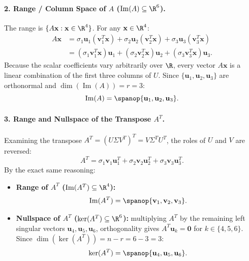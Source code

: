\paragraph{2. Range / Column Space of $A$ ($\operatorname{Im}(A) \subseteq \R^6$).}
The range is $\{A\mathbf{x} : \mathbf{x} \in \R^4\}$. For any $\mathbf{x} \in \R^4$:
\begin{align}
    A\mathbf{x} &= \sigma_1 \mathbf{u}_1 (\mathbf{v}_1^T \mathbf{x}) + \sigma_2 \mathbf{u}_2 (\mathbf{v}_2^T \mathbf{x}) + \sigma_3 \mathbf{u}_3 (\mathbf{v}_3^T \mathbf{x}) \nonumber \\
                &= (\sigma_1 \mathbf{v}_1^T \mathbf{x}) \mathbf{u}_1 + (\sigma_2 \mathbf{v}_2^T \mathbf{x}) \mathbf{u}_2 + (\sigma_3 \mathbf{v}_3^T \mathbf{x}) \mathbf{u}_3.
\end{align}
Because the scalar coefficients vary arbitrarily over $\R$, every vector $A\mathbf{x}$ is a linear combination of the first three columns of $U$. Since $\{\mathbf{u}_1, \mathbf{u}_2, \mathbf{u}_3\}$ are orthonormal and $\dim(\operatorname{Im}(A)) = r = 3$:
\begin{equation}
    \operatorname{Im}(A) = \spanop\{\mathbf{u}_1, \mathbf{u}_2, \mathbf{u}_3\}.
\end{equation}

\paragraph{3. Range and Nullspace of the Transpose $A^T$.}
Examining the transpose $A^T = (U \Sigma V^T)^T = V \Sigma^T U^T$, the roles of $U$ and $V$ are reversed:
\begin{equation}
    A^T = \sigma_1 \mathbf{v}_1 \mathbf{u}_1^T + \sigma_2 \mathbf{v}_2 \mathbf{u}_2^T + \sigma_3 \mathbf{v}_3 \mathbf{u}_3^T.
\end{equation}
By the exact same reasoning:
\begin{itemize}
    \item \textbf{Range of $A^T$ ($\operatorname{Im}(A^T) \subseteq \R^4$):}
    \begin{equation}
        \operatorname{Im}(A^T) = \spanop\{\mathbf{v}_1, \mathbf{v}_2, \mathbf{v}_3\}.
    \end{equation}
    \item \textbf{Nullspace of $A^T$ ($\ker(A^T) \subseteq \R^6$):}
    multiplying $A^T$ by the remaining left singular vectors $\mathbf{u}_4, \mathbf{u}_5, \mathbf{u}_6$, orthogonality gives $A^T \mathbf{u}_k = \mathbf{0}$ for $k \in \{4, 5, 6\}$. Since $\dim(\ker(A^T)) = n - r = 6 - 3 = 3$:
    \begin{equation}
        \ker(A^T) = \spanop\{\mathbf{u}_4, \mathbf{u}_5, \mathbf{u}_6\}.
    \end{equation}
\end{itemize}


